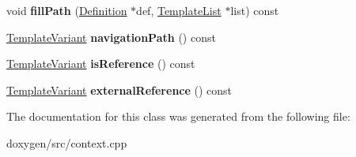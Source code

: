\begin{DoxyCompactItemize}
\mbox{\label{class_definition_context_a4f8fe9ea5ade2790637d574bb3cbb89f}} 
void {\bfseries fill\+Path} (\mbox{\hyperlink{class_definition}{Definition}} $\ast$def, \mbox{\hyperlink{class_template_list}{Template\+List}} $\ast$list) const
\item 
\mbox{\label{class_definition_context_a0ccd66b7ef4bc8ab5930f2aebfb603c1}} 
\mbox{\hyperlink{class_template_variant}{Template\+Variant}} {\bfseries navigation\+Path} () const
\item 
\mbox{\label{class_definition_context_a1959dff040aff4a1c9170010d8a4de77}} 
\mbox{\hyperlink{class_template_variant}{Template\+Variant}} {\bfseries is\+Reference} () const
\item 
\mbox{\label{class_definition_context_a52ddd2511bfb2a7ab0da61444ff849d0}} 
\mbox{\hyperlink{class_template_variant}{Template\+Variant}} {\bfseries external\+Reference} () const
\end{DoxyCompactItemize}


The documentation for this class was generated from the following file\+:\begin{DoxyCompactItemize}
\item 
doxygen/src/context.\+cpp\end{DoxyCompactItemize}
